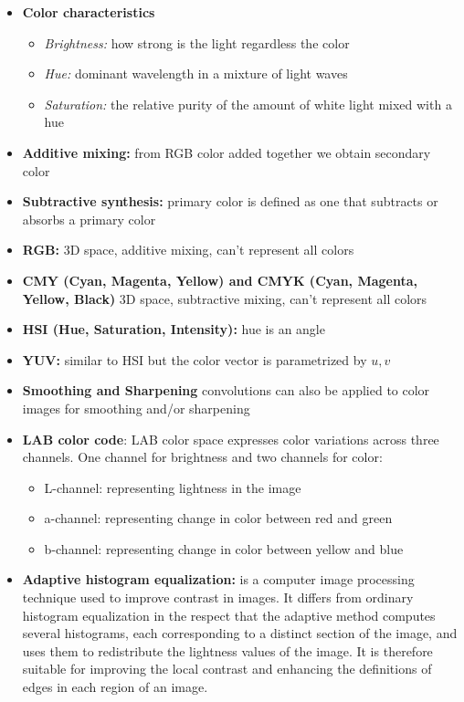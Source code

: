 \documentclass{article}
\begin{document}
\begin{itemize}
    \item \textbf{Color characteristics}
    \begin{itemize}
        \item \textit{Brightness:} how strong is the light regardless the color
        \item \textit{Hue:} dominant wavelength in a mixture of light waves
        \item \textit{Saturation:} the relative purity of the amount of white light mixed with a hue
    \end{itemize}
    \item \textbf{Additive mixing:} from RGB color added together we obtain secondary color
    \item \textbf{Subtractive synthesis:} primary color is defined as one that subtracts or absorbs a primary color
    \item \textbf{RGB:} 3D space, additive mixing, can't represent all colors
    \item \textbf{CMY (Cyan, Magenta, Yellow) and CMYK (Cyan, Magenta, Yellow, Black)} 3D space, subtractive mixing, can't represent all colors
    \item \textbf{HSI (Hue, Saturation, Intensity):} hue is an angle
    \item \textbf{YUV:} similar to HSI but the color vector is parametrized by \(u,v\)
    \item \textbf{Smoothing and Sharpening} convolutions can also be applied to color images for smoothing and/or sharpening
    \item \textbf{LAB color code}: LAB color space expresses color variations across three channels. One channel for brightness and two channels for color:
    \begin{itemize}
        \item L-channel: representing lightness in the image
        \item a-channel: representing change in color between red and green
        \item b-channel: representing change in color between yellow and blue
    \end{itemize}
    \item \textbf{Adaptive histogram equalization:}  is a computer image processing technique used to improve contrast in images. It differs from ordinary histogram equalization in the respect that the adaptive method computes several histograms, each corresponding to a distinct section of the image, and uses them to redistribute the lightness values of the image. It is therefore suitable for improving the local contrast and enhancing the definitions of edges in each region of an image.

\end{itemize}
\end{document}
